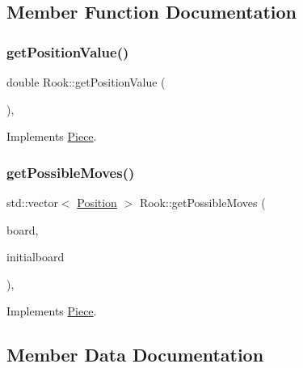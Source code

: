 \subsection{Member Function Documentation}
\mbox{\label{class_rook_ab1d83e6acb838249647f1f5fa7d17f41}} 
\subsubsection{\texorpdfstring{get\+Position\+Value()}{getPositionValue()}}
{\footnotesize\ttfamily double Rook\+::get\+Position\+Value (\begin{DoxyParamCaption}{ }\end{DoxyParamCaption})\hspace{0.3cm}{\ttfamily [override]}, {\ttfamily [virtual]}}



Implements \hyperlink{class_piece_a4adfa58b4f0368c9a5859afcf294e0a4}{Piece}.

\mbox{\label{class_rook_a631fce9b569ccf40b5b27cc6cc13cd93}} 
\subsubsection{\texorpdfstring{get\+Possible\+Moves()}{getPossibleMoves()}}
{\footnotesize\ttfamily std\+::vector$<$ \hyperlink{struct_position}{Position} $>$ Rook\+::get\+Possible\+Moves (\begin{DoxyParamCaption}\item[{std\+::shared\+\_\+ptr$<$ \hyperlink{class_base_board}{Base\+Board} $>$}]{board,  }\item[{bool}]{initialboard }\end{DoxyParamCaption})\hspace{0.3cm}{\ttfamily [override]}, {\ttfamily [virtual]}}



Implements \hyperlink{class_piece_a8891924c280568529878549f59541925}{Piece}.



\subsection{Member Data Documentation}
\mbox{\label{class_rook_a2066de8a5df66bf3b8089d9d33e079ab}} 

